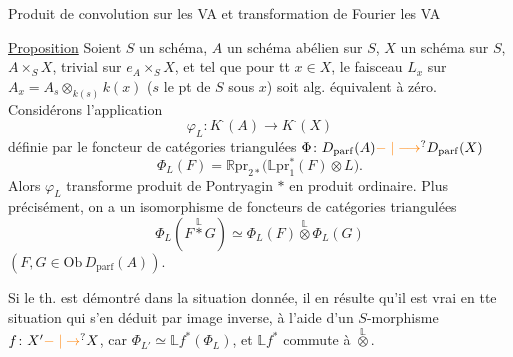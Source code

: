 Produit de convolution sur les VA et transformation de Fourier  les VA

\uline{Proposition}  Soient $S$ un schéma, $A$ un schéma abélien sur $S$, $X$ un schéma sur $S$,   $A\times_S X$,  trivial sur $e_A\times_S X$, et tel que  pour tt $x\in X$, le faisceau $L_x$ sur $A_x=A_s\otimes_{k(s)}k(x)$ ($s$ le pt de $S$ sous $x$) soit alg. équivalent à zéro. Considérons l'application
\[
\varphi_L\colon K^{\cdot}(A)\longrightarrow K^{\cdot}(X)
\]
définie par  le foncteur de catégories triangulées \deleted{$\unsure{\varphi}$} $\Phi\colon D_{\mathrm{parf}}(A)\unsure{\mathrel{-}|\longrightarrow}D_{\mathrm{parf}}(X)$
\[
\Phi_L(F)=\mathbb{R}\mathrm{pr}_{2*}\bigl(\mathbb{L}\mathrm{pr}_1^*(F)\otimes L\bigr).
\]
Alors $\varphi_L$ transforme produit de Pontryagin $*$ en produit ordinaire. Plus précisément, on a un isomorphisme de foncteurs de catégories triangulées
\[
\Phi_L(F\overset{\mathbb L}{*}G)\simeq\Phi_L(F)\overset{\mathbb L}{\otimes}\Phi_L(G)
\]
$(F,G\in\mathrm{Ob}\,D_{\mathrm{parf}}(A))$.

Si le th. est démontré dans la situation donnée, il en résulte qu'il est vrai en tte situation  qui s'en déduit par image inverse, à l'aide d'un $S$-morphisme $f\colon X'\unsure{\mathrel{-}|\to}X$, car $\Phi_{L'}\simeq\mathbb{L}f^*(\Phi_L)$, et $\mathbb{L}f^*$ commute à $\overset{\mathbb L}{\otimes}$.

